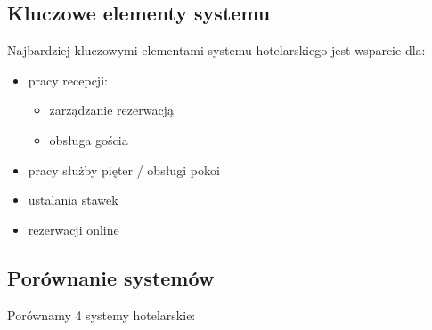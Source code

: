 \documentclass[a4paper,onecolumn,oneside,11pt,wide,floatssmall]{mwrep}
\theoremstyle{definition}
\theoremstyle{plain}%
\theoremstyle{remark}
\begin{document}
\subsection{Kluczowe elementy systemu}

Najbardziej kluczowymi elementami systemu hotelarskiego jest wsparcie dla:
\begin{itemize} 
  \item pracy recepcji:
    \begin{itemize}
      \item zarządzanie rezerwacją
      \item obsługa gościa
    \end{itemize}
  \item pracy służby pięter / obsługi pokoi
  \item ustalania stawek
  \item rezerwacji online
\end{itemize}






\subsection{Porównanie systemów}
Porównamy 4 systemy hotelarskie:
\end{document}
